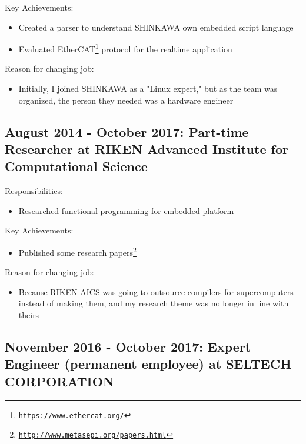 \documentclass[letterpaper]{article}
\begin{document}
\noindent Key Achievements:

\begin{itemize}
  \item Created a parser to understand SHINKAWA own embedded script language
  \item Evaluated EtherCAT\footnote{\href{https://www.ethercat.org/}{\tt https://www.ethercat.org/}} protocol for the realtime application
\end{itemize}

\noindent Reason for changing job:

\begin{itemize}
  \item Initially, I joined SHINKAWA as a "Linux expert," but as the team was organized, the person they needed was a hardware engineer
\end{itemize}

\subsection*{August 2014 - October 2017: Part-time Researcher at RIKEN Advanced Institute for Computational Science}

\noindent Responsibilities:

\begin{itemize}
  \item Researched functional programming for embedded platform
\end{itemize}

\noindent Key Achievements:

\begin{itemize}
  \item Published some research papers\footnote{\href{http://www.metasepi.org/papers.html}{\tt http://www.metasepi.org/papers.html}}
\end{itemize}

\noindent Reason for changing job:

\begin{itemize}
  \item Because RIKEN AICS was going to outsource compilers for supercomputers instead of making them, and my research theme was no longer in line with theirs
\end{itemize}

\subsection*{November 2016 - October 2017: Expert Engineer (permanent employee) at SELTECH CORPORATION}
\end{document}
